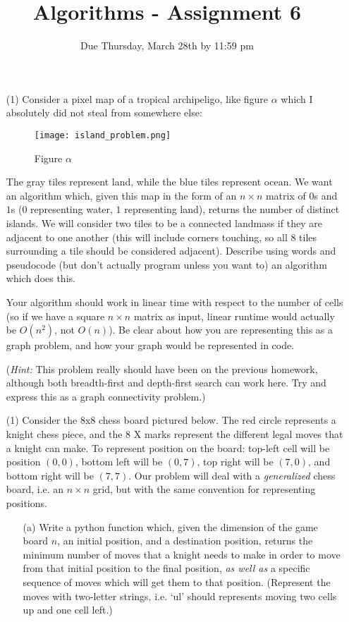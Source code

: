 \documentclass[12pt]{article}
\title{Algorithms - Assignment 6}
\date{Due Thursday, March 28th by 11:59 pm}
\begin{document}
\maketitle

\begin{enumerate}
    \item[(1)] Consider a pixel map of a tropical archipeligo, like figure $\alpha$ which I absolutely did not steal from somewhere else:
        \begin{figure}[h]
            \centering
            \texttt{[image: island\_problem.png]}
            \caption{Figure $\alpha$}
        \end{figure}
    The gray tiles represent land, while the blue tiles represent ocean. We want an algorithm which, given this map in the form of an $n \times n$ matrix of $0$s and $1$s ($0$ representing water, $1$ representing land), returns the number of distinct islands. We will consider two tiles to be a connected landmass if they are adjacent to one another (this will include corners touching, so all 8 tiles surrounding a tile should be considered adjacent). Describe using words and pseudocode (but don't actually program unless you want to) an algorithm which does this. \par 
    
    Your algorithm should work in linear time with respect to the number of cells (so if we have a square $n \times n$ matrix as input, linear runtime would actually be $O(n^2)$, not $O(n)$). Be clear about how you are representing this as a graph problem, and how your graph would be represented in code. \par 
    
    (\emph{Hint:} This problem really should have been on the previous homework, although both breadth-first and depth-first search can work here. Try and express this as a graph connectivity problem.)
    \item[(1)] Consider the 8x8 chess board pictured below. The red circle represents a knight chess piece, and the 8 X marks represent the different legal moves that a knight can make. To represent position on the board: top-left cell will be position $(0,0)$, bottom left will be $(0,7)$, top right will be $(7,0)$, and bottom right will be $(7,7)$. Our problem will deal with a \emph{generalized} chess board, i.e. an $n \times n$ grid, but with the same convention for representing positions. \par 
    \begin{itemize}
        \item[(a)] Write a python function which, given the dimension of the game board $n$, an initial position, and a destination position, returns the minimum number of moves that a knight needs to make in order to move from that initial position to the final position, \emph{as well as} a specific sequence of moves which will get them to that position. (Represent the moves with two-letter strings, i.e. `ul' should represents moving two cells up and one cell left.) \par 
    

\end{itemize}
\end{enumerate}
\end{document}
